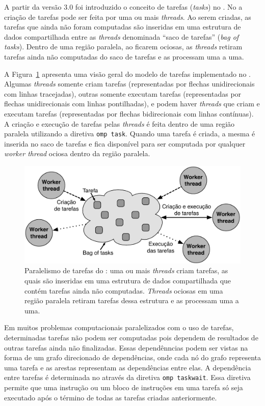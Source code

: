 \documentclass{SBCbookchapter}
\begin{document}
	A partir da versão 3.0 foi introduzido o conceito de tarefas
	(\textit{tasks}) no \openmp.  No \openmp a criação de tarefas pode
	ser feita por uma ou mais \textit{threads}. Ao serem criadas, as
	tarefas que ainda não foram computadas são inseridas em uma
	estrutura de dados compartilhada entre as \textit{threads}
	denominada ``saco de tarefas'' (\textit{bag of tasks}). Dentro de
	uma região paralela, ao ficarem ociosas, as \textit{threads} retiram
	tarefas ainda não computadas do saco de tarefas e as processam uma a
	uma.
	
	A Figura~\ref{fig:tasks} apresenta uma visão geral do modelo de
	tarefas implementado no \openmp. Algumas \textit{threads} somente
	criam tarefas (representadas por flechas unidirecionais com linhas
	tracejadas), outras somente executam tarefas (representadas por
	flechas unidirecionais com linhas pontilhadas), e podem haver
	\textit{threads} que criam e executam tarefas (representadas por
	flechas bidirecionais com linhas contínuas).  A criação e execução
	de tarefas pelas \textit{threads} é feita dentro de uma região
	paralela utilizando a diretiva \texttt{omp task}. Quando uma tarefa
	é criada, a mesma é inserida no saco de tarefas e fica disponível
	para ser computada por qualquer \textit{worker thread} ociosa dentro
	da região paralela.

	\begin{figure}[t]
		\centering
		\includegraphics[width=0.6\linewidth]{img/tasks}
		\caption{Paralelismo de tarefas do \openmp: uma ou mais \textit{threads} criam
		tarefas, as quais são inseridas em uma estrutura de dados compartilhada
		que contém tarefas ainda não computadas. \textit{Threads} ociosas em
		uma região paralela retiram tarefas dessa estrutura e as processam uma a
		uma.}
		\label{fig:tasks}
	\end{figure}

	Em muitos problemas computacionais paralelizados com o uso de
	tarefas, determinadas tarefas não podem ser computadas pois dependem
	de resultados de outras tarefas ainda não finalizadas. Essas
	dependênncias podem ser vistas na forma de um grafo direcionado de
	dependências, onde cada nó do grafo representa uma tarefa e as
	arestas representam as dependências entre elas. A dependência entre
	tarefas é determinada no \openmp através da diretiva \texttt{omp
	taskwait}. Essa diretiva permite que uma instrução ou um bloco de
	instruções em uma tarefa só seja executado após o término de todas
	as tarefas criadas anteriormente.
	
\end{document}
